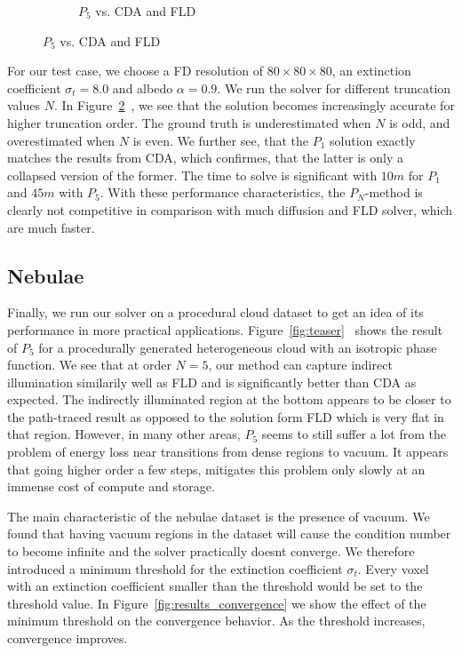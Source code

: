 \begin{figure}[h]
\begin{subfigure}{0.45\columnwidth}
\caption{$P_5$ vs. CDA and FLD}
\label{fig:pointsource_p5}
\end{subfigure}%
\vspace{-0.1in}
\label{fig:pointsource}
\end{figure}

For our test case, we choose a FD resolution of $80\times80\times80$, an extinction coefficient $\sigma_t=8.0$ and albedo $\alpha=0.9$. We run the solver for different truncation values $N$. In Figure~\ref{fig:pointsource}~, we see that the solution becomes increasingly accurate for higher truncation order. The ground truth is underestimated when $N$ is odd, and overestimated when $N$ is even. We further see, that the $P_1$ solution exactly matches the results from CDA, which confirmes, that the latter is only a collapsed version of the former. The time to solve is significant with $10m$ for $P_1$ and $45m$ with $P_5$. With these performance characteristics, the $P_N$-method is clearly not competitive in comparison with much diffusion and FLD solver, which are much faster.

\subsection{Nebulae}

Finally, we run our solver on a procedural cloud dataset to get an idea of its performance in more practical applications. Figure~\ref{fig:teaser}~ shows the result of $P_5$ for a procedurally generated heterogeneous cloud with an isotropic phase function. We see that at order $N=5$, our method can capture indirect illumination similarily well as FLD and is significantly better than CDA as expected. The indirectly illuminated region at the bottom appears to be closer to the path-traced result as opposed to the solution form FLD which is very flat in that region. However, in many other areas, $P_5$ seems to still suffer a lot from the problem of energy loss near transitions from dense regions to vacuum. It appears that going higher order a few steps, mitigates this problem only slowly at an immense cost of compute and storage.

The main characteristic of the nebulae dataset is the presence of vacuum. We found that having vacuum regions in the dataset will cause the condition number to become infinite and the solver practically doesnt converge. We therefore introduced a minimum threshold for the extinction coefficient $\sigma_t$. Every voxel with an extinction coefficient smaller than the threshold would be set to the threshold value. In Figure~\ref{fig:results_convergence} we show the effect of the minimum threshold on the convergence behavior. As the threshold increases, convergence improves.

